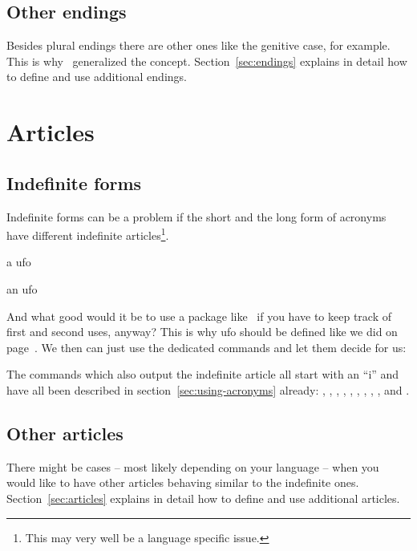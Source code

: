 \documentclass{acro-manual}
\begin{document}
\subsection{Other endings}\label{sec:other-endings}
Besides plural endings there are other ones like the genitive case, for
example.  This is why \acro\ generalized the concept.
Section~\vref{sec:endings} explains in detail how to define and use additional
endings.

\section{Articles}
\subsection{Indefinite forms}\label{sec:indefinite-forms}
Indefinite forms can be a problem if the short and the long form of acronyms
have different indefinite articles\footnote{This may very well be a language
  specific issue.}.
\begin{example}
  a \ac{ufo} \par
  an \ac{ufo}
\end{example}
And what good would it be to use a package like \acro\ if you have to keep
track of first and second uses, anyway?  This is why \acs{ufo} should be defined
like we did on page~\pageref{ufo}.  We then can just use the dedicated
commands and let them decide for us:
\begin{example}
   \par
\end{example}
The commands which also output the indefinite article all start with an
\enquote{i} and have all been described in section~\vref{sec:using-acronyms}
already: , , , , , ,
, , , and .

\subsection{Other articles}\label{sec:other-articles}
There might be cases -- most likely depending on your language -- when you
would like to have other articles behaving similar to the indefinite ones.
Section~\ref{sec:articles} explains in detail how to define and use additional
articles.
\end{document}
